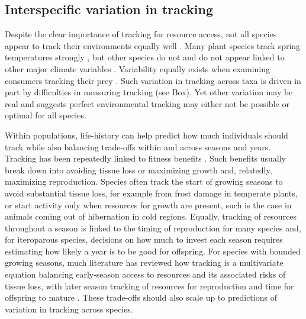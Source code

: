 \documentclass[11pt,letterpaper]{article}
\begin{document}
\subsection{Interspecific variation in tracking}
Despite the clear importance of tracking for resource access, not all species appear to track their environments equally well \citep{thackeray2016}. Many plant species track spring temperatures strongly \citep[multiple meta-analysis now show plants's spring phenology on average track spring or annual temperatures 4-6 days/$\degree$C][and simple temperature models can often explain over 90\% of interannual variation in phenology]{Richardson:2006qh,Wolkovich:2012n,thackeray2016}, but other species do not \citep{Cook:2012pnas} and do not appear linked to other major climate variables \citep{thackeray2016}. Variability equally exists when examining consumers tracking their prey \citep[across diverse species tracking over time is 6.1 days/decade but ranges from zero to 15 days/decade, see][]{kharouba2018}. Such variation in tracking across taxa is driven in part by difficulties in measuring tracking (see Box). Yet other variation may be real and suggests perfect environmental tracking may either not be possible or optimal for all species. 

Within populations, life-history can help predict how much individuals should track while also balancing trade-offs within and across seasons and years. Tracking has been repeatedly linked to fitness benefits \citep[e.g.,][]{farzan2018,deacy2018}. Such benefits usually break down into avoiding tissue loss or maximizing growth and, relatedly, maximizing reproduction. Species often track the start of growing seasons to avoid substantial tissue loss, for example from frost damage in temperate plants, or start activity only when resources for growth are present, such is the case in animals coming out of hibernation in cold regions. Equally, tracking of resources throughout a season is linked to the timing of reproduction for many species and, for iteroparous species, decisions on how much to invest each season requires estimating how likely a year is to be good for offspring. For species with bounded growing seasons, much literature has reviewed how tracking is a multivariate equation balancing early-season access to resources and its associated risks of tissue loss, with later season tracking of resources for reproduction and time for offspring to mature \citep{donohue2002,Morin:2005ye,Burghardt2015}. These trade-offs should also scale up to predictions of variation in tracking across species. 
\end{document}
